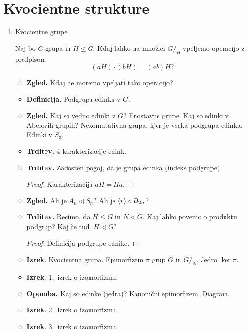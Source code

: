 \section{Kvocientne strukture}

\begin{enumerate}
    \item Kvocientne grupe
    
    Naj bo \(G\) grupa in \(H \leq G\). Kdaj lahko na množici \(G/_H\) vpeljemo operacijo z predpisom 
    \[(aH) \cdot (bH) = (ab)H?\]
    \begin{itemize}
        \item \textbf{Zgled.} Kdaj ne moremo vpeljati tako operacijo?
        \item \textbf{Definicija.} Podgrupa edinka v \(G\).
        \item \textbf{Zgled.} Kaj so vedno edinki v \(G\)? Enostavne grupe. Kaj so edinki v Abelovih grupih? Nekomutativna grupa, kjer je vsaka podgrupa edinka. Edinki v \(S_3\).
        \item \textbf{Trditev.} 4 karakterizacije edink. 
        \item \textbf{Trditev.} Zadosten pogoj, da je grupa edinka (indeks podgrupe).
        \begin{proof}
            Karakterizacija \(aH = Ha\).
        \end{proof}
        \item \textbf{Zgled.} Ali je \(A_n \triangleleft S_n\)? Ali je \(\left\langle {r} \right\rangle \triangleleft D_{2n}\)?
        \item \textbf{Trditev.} Recimo, da \(H \leq G\) in \(N \triangleleft G\). Kaj lahko povemo o produktu podgrup? Kaj če tudi \(H \triangleleft G\)?
        \begin{proof}
            Definicija podgrupe ednike.
        \end{proof}
        \item \textbf{Izrek.} Kvocientna grupa. Epimorfizem \(\pi\) grup \(G\) in \(G/_N\). Jedro \(\ker \pi\).
        \item \textbf{Izrek.} 1.\ izrek o izomorfizmu.
        \item \textbf{Opomba.} Kaj so edinke (jedra)? Kanonični epimorfizem. Diagram.
        \item \textbf{Izrek.} 2.\ izrek o izomorfizmu.
        \item \textbf{Izrek.} 3.\ izrek o izomorfizmu.
    \end{itemize}


\end{enumerate}

